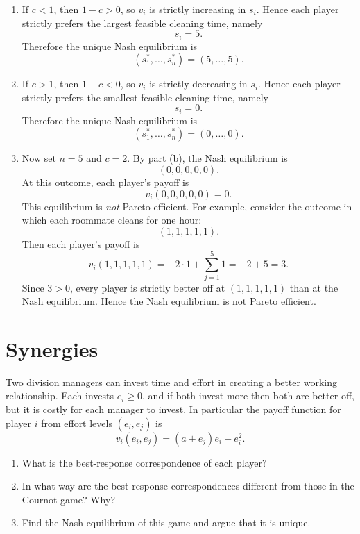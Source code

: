 \documentclass[12pt,a4paper]{article}
\begin{document}
\begin{enumerate}[label=(\alph*)]
  \item If $c<1$, then $1-c>0$, so $v_i$ is strictly increasing in $s_i$. Hence each player strictly prefers the largest feasible cleaning time, namely
  \[
      s_i=5.
  \]
  Therefore the unique Nash equilibrium is
  \[
      (s_1^*,\dots,s_n^*)=(5,\dots,5).
  \]

  \item If $c>1$, then $1-c<0$, so $v_i$ is strictly decreasing in $s_i$. Hence each player strictly prefers the smallest feasible cleaning time, namely
  \[
      s_i=0.
  \]
  Therefore the unique Nash equilibrium is
  \[
      (s_1^*,\dots,s_n^*)=(0,\dots,0).
  \]

  \item Now set $n=5$ and $c=2$. By part (b), the Nash equilibrium is
  \[
      (0,0,0,0,0).
  \]
  At this outcome, each player's payoff is
  \[
      v_i(0,0,0,0,0)=0.
  \]
  This equilibrium is \emph{not} Pareto efficient. For example, consider the outcome in which each roommate cleans for one hour:
  \[
      (1,1,1,1,1).
  \]
  Then each player's payoff is
  \[
      v_i(1,1,1,1,1)=-2\cdot 1+\sum_{j=1}^5 1=-2+5=3.
  \]
  Since $3>0$, every player is strictly better off at $(1,1,1,1,1)$ than at the Nash equilibrium. Hence the Nash equilibrium is not Pareto efficient.
\end{enumerate}

\section{Synergies}
Two division managers can invest time and effort in creating a better working relationship. Each invests $e_i\ge 0$, and if both invest more then both are better off, but it is costly for each manager to invest. In particular the payoff function for player $i$ from effort levels $(e_i,e_j)$ is
\[
    v_i(e_i,e_j)=(a+e_j)e_i-e_i^2.
\]
\begin{enumerate}[label=(\alph*)]
  \item What is the best-response correspondence of each player?
  \item In what way are the best-response correspondences different from those in the Cournot game? Why?
  \item Find the Nash equilibrium of this game and argue that it is unique.
\end{enumerate}

\vspace{0.5cm}
\end{document}
